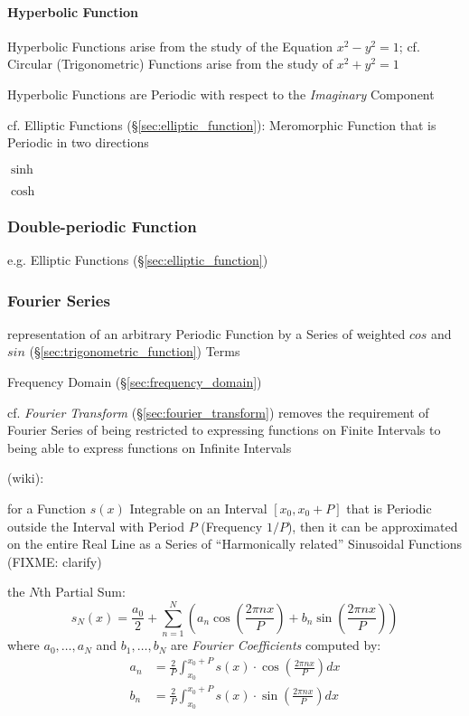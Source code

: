 \paragraph{Hyperbolic Function}\label{sec:hyperbolic_function}\hfill

Hyperbolic Functions arise from the study of the Equation $x^2 - y^2 = 1$; cf.
Circular (Trigonometric) Functions arise from the study of $x^2 + y^2 = 1$

Hyperbolic Functions are Periodic with respect to the \emph{Imaginary}
Component

cf. Elliptic Functions (\S\ref{sec:elliptic_function}): Meromorphic Function
that is Periodic in two directions

$\sinh$

$\cosh$



\subsubsection{Double-periodic Function}\label{sec:double_periodic}

e.g. Elliptic Functions (\S\ref{sec:elliptic_function})



\subsubsection{Fourier Series}\label{sec:fourier_series}

representation of an arbitrary Periodic Function by a Series of weighted $cos$
and $sin$ (\S\ref{sec:trigonometric_function}) Terms

\fist Frequency Domain (\S\ref{sec:frequency_domain})

\fist cf. \emph{Fourier Transform} (\S\ref{sec:fourier_transform}) removes the
requirement of Fourier Series of being restricted to expressing functions on
Finite Intervals to being able to express functions on Infinite Intervals

(wiki):

for a Function $s(x)$ Integrable on an Interval $[x_0,x_0 + P]$ that is
Periodic outside the Interval with Period $P$ (Frequency $1/P$), then it can be
approximated on the entire Real Line as a Series of ``Harmonically related''
Sinusoidal Functions (FIXME: clarify)

the $N$th Partial Sum:
\[
  s_N(x) = \frac{a_0}{2} + \sum_{n=1}^N \left(
    a_n\cos(\frac{2\pi{nx}}{P}) + b_n\sin(\frac{2\pi{nx}}{P})
  \right)
\]
where $a_0,\ldots,a_N$ and $b_1,\ldots,b_N$ are \emph{Fourier Coefficients}
computed by:
\begin{align*}
  a_n & = \frac{2}{P}\int_{x_0}^{x_0+P}s(x) \cdot \cos(\frac{2\pi{nx}}{P}) dx \\
  b_n & = \frac{2}{P}\int_{x_0}^{x_0+P}s(x) \cdot \sin(\frac{2\pi{nx}}{P}) dx
\end{align*}

